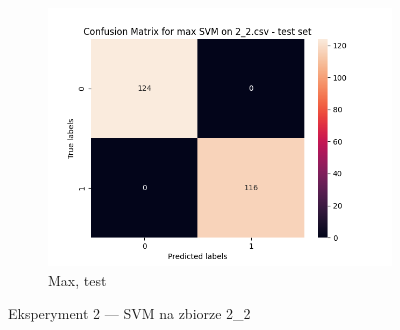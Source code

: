 \documentclass[12pt]{article}
\newcommand*{\subfigwidth}{0.24\textwidth}
\begin{document}
\begin{figure}[H]
\begin{subfigure}[t]{\subfigwidth}
        \includegraphics[width=\linewidth]{img/exp_2/svm/2_2/max/test_matrix.png}
        \caption{Max, test}
    \end{subfigure} 
    
    \caption{Eksperyment 2 --- SVM na zbiorze 2\_2}
\end{figure}
\end{document}
